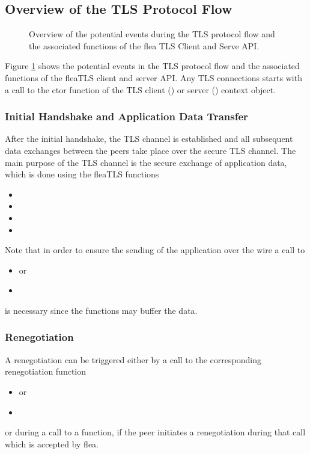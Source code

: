 \documentclass[a4paper,11pt]{scrartcl}
\begin{document}
\subsection{Overview of the TLS Protocol Flow}
\begin{figure}

\caption{Overview of the potential events during the TLS protocol flow and the
associated functions of the flea TLS Client and Serve API.}
\label{figTlsSeqFlow}
\end{figure}

Figure \ref{figTlsSeqFlow} shows the potential events in the TLS protocol flow
and the associated functions of the fleaTLS client and server API. Any TLS
connections starts with a call to the ctor function of the TLS client
(\clientCtx) or server (\serverCtx) context object.

\subsubsection{Initial Handshake and Application Data Transfer}
After the initial handshake, the TLS channel is established and all subsequent
data exchanges between the peers take place over the secure TLS channel. The
main purpose of the TLS channel is the secure exchange of application data,
which is done using the fleaTLS functions 
\begin{itemize}
  \item {}
\item {}
\item {}
  \item {}
\end{itemize}

Note that in order to ensure the sending of the application over the wire a call
to 
\begin{itemize}
  \item {} or
  \item {}
  \end{itemize}
  is necessary since the  functions may buffer the data.

  \subsubsection{Renegotiation}
A renegotiation can be triggered either by a call to the corresponding
renegotiation function
\begin{itemize}
  \item {} or
\item {}
  \end{itemize}
  or during a call to a  function, if the peer initiates a
  renegotiation during that call which is accepted by flea.
\end{document}
